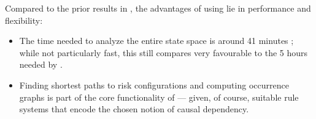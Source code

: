 \medskip\noindent Compared to the prior results in \cite{DBLP:conf/cmsb/BowlesBBFGM24}, the advantages of using \GROOVE lie in performance and flexibility:
\begin{itemize}
\item The time needed to analyze the entire state space is around 41 minutes \GROOVE; while not particularly fast, this still compares very favourable to the 5 hours needed by \BioResolve.

\item Finding shortest paths to risk configurations and computing occurrence graphs is part of the core functionality of \GROOVE --- given, of course, suitable rule systems that encode the chosen notion of causal dependency.
\end{itemize}

